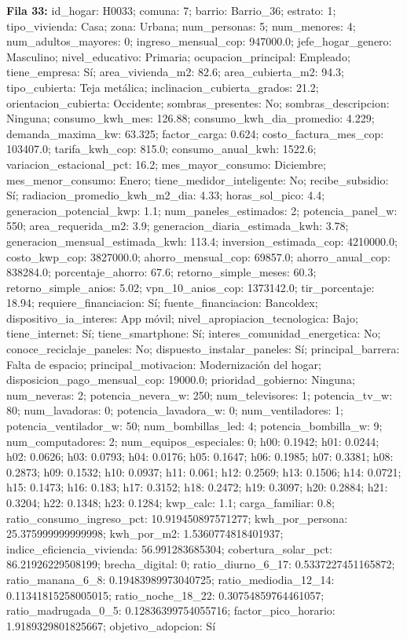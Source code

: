 {\footnotesize\textbf{Fila 33:} id\_hogar: H0033; comuna: 7; barrio: Barrio\_36; estrato: 1; tipo\_vivienda: Casa; zona: Urbana; num\_personas: 5; num\_menores: 4; num\_adultos\_mayores: 0; ingreso\_mensual\_cop: 947000.0; jefe\_hogar\_genero: Masculino; nivel\_educativo: Primaria; ocupacion\_principal: Empleado; tiene\_empresa: Sí; area\_vivienda\_m2: 82.6; area\_cubierta\_m2: 94.3; tipo\_cubierta: Teja metálica; inclinacion\_cubierta\_grados: 21.2; orientacion\_cubierta: Occidente; sombras\_presentes: No; sombras\_descripcion: Ninguna; consumo\_kwh\_mes: 126.88; consumo\_kwh\_dia\_promedio: 4.229; demanda\_maxima\_kw: 63.325; factor\_carga: 0.624; costo\_factura\_mes\_cop: 103407.0; tarifa\_kwh\_cop: 815.0; consumo\_anual\_kwh: 1522.6; variacion\_estacional\_pct: 16.2; mes\_mayor\_consumo: Diciembre; mes\_menor\_consumo: Enero; tiene\_medidor\_inteligente: No; recibe\_subsidio: Sí; radiacion\_promedio\_kwh\_m2\_dia: 4.33; horas\_sol\_pico: 4.4; generacion\_potencial\_kwp: 1.1; num\_paneles\_estimados: 2; potencia\_panel\_w: 550; area\_requerida\_m2: 3.9; generacion\_diaria\_estimada\_kwh: 3.78; generacion\_mensual\_estimada\_kwh: 113.4; inversion\_estimada\_cop: 4210000.0; costo\_kwp\_cop: 3827000.0; ahorro\_mensual\_cop: 69857.0; ahorro\_anual\_cop: 838284.0; porcentaje\_ahorro: 67.6; retorno\_simple\_meses: 60.3; retorno\_simple\_anios: 5.02; vpn\_10\_anios\_cop: 1373142.0; tir\_porcentaje: 18.94; requiere\_financiacion: Sí; fuente\_financiacion: Bancoldex; dispositivo\_ia\_interes: App móvil; nivel\_apropiacion\_tecnologica: Bajo; tiene\_internet: Sí; tiene\_smartphone: Sí; interes\_comunidad\_energetica: No; conoce\_reciclaje\_paneles: No; dispuesto\_instalar\_paneles: Sí; principal\_barrera: Falta de espacio; principal\_motivacion: Modernización del hogar; disposicion\_pago\_mensual\_cop: 19000.0; prioridad\_gobierno: Ninguna; num\_neveras: 2; potencia\_nevera\_w: 250; num\_televisores: 1; potencia\_tv\_w: 80; num\_lavadoras: 0; potencia\_lavadora\_w: 0; num\_ventiladores: 1; potencia\_ventilador\_w: 50; num\_bombillas\_led: 4; potencia\_bombilla\_w: 9; num\_computadores: 2; num\_equipos\_especiales: 0; h00: 0.1942; h01: 0.0244; h02: 0.0626; h03: 0.0793; h04: 0.0176; h05: 0.1647; h06: 0.1985; h07: 0.3381; h08: 0.2873; h09: 0.1532; h10: 0.0937; h11: 0.061; h12: 0.2569; h13: 0.1506; h14: 0.0721; h15: 0.1473; h16: 0.183; h17: 0.3152; h18: 0.2472; h19: 0.3097; h20: 0.2884; h21: 0.3204; h22: 0.1348; h23: 0.1284; kwp\_calc: 1.1; carga\_familiar: 0.8; ratio\_consumo\_ingreso\_pct: 10.919450897571277; kwh\_por\_persona: 25.375999999999998; kwh\_por\_m2: 1.5360774818401937; indice\_eficiencia\_vivienda: 56.991283685304; cobertura\_solar\_pct: 86.21926229508199; brecha\_digital: 0; ratio\_diurno\_6\_17: 0.5337227451165872; ratio\_manana\_6\_8: 0.19483989973040725; ratio\_mediodia\_12\_14: 0.11341815258005015; ratio\_noche\_18\_22: 0.30754859764461057; ratio\_madrugada\_0\_5: 0.12836399754055716; factor\_pico\_horario: 1.9189329801825667; objetivo\_adopcion: Sí\par}
